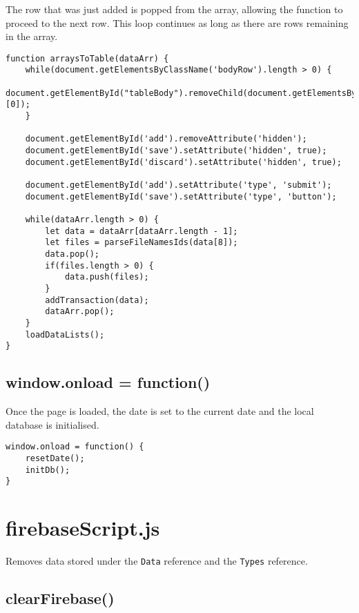 \documentclass[letterpaper]{article}
\begin{document}
The row that was just added is popped from the array, allowing the function to proceed to the next row.
This loop continues as long as there are rows remaining in the array.

\begin{lstlisting}[firstnumber=765]
function arraysToTable(dataArr) {
    while(document.getElementsByClassName('bodyRow').length > 0) {
        document.getElementById("tableBody").removeChild(document.getElementsByClassName('bodyRow')[0]);
    }

    document.getElementById('add').removeAttribute('hidden');
    document.getElementById('save').setAttribute('hidden', true);
    document.getElementById('discard').setAttribute('hidden', true);

    document.getElementById('add').setAttribute('type', 'submit');
    document.getElementById('save').setAttribute('type', 'button');

    while(dataArr.length > 0) {
        let data = dataArr[dataArr.length - 1];
        let files = parseFileNamesIds(data[8]);
        data.pop();
        if(files.length > 0) {
            data.push(files);
        }
        addTransaction(data);
        dataArr.pop();
    }
    loadDataLists();
}
\end{lstlisting}

\subsection{window.onload = function()}

Once the page is loaded, the date is set to the current date and the local database is initialised.

\begin{lstlisting}[firstnumber=790]
window.onload = function() {
    resetDate();
    initDb();
}
\end{lstlisting}

\newpage

\section{firebaseScript.js}

Removes data stored under the \lstinline{Data} reference and the \lstinline{Types} reference.

\subsection{clearFirebase()}
\end{document}
